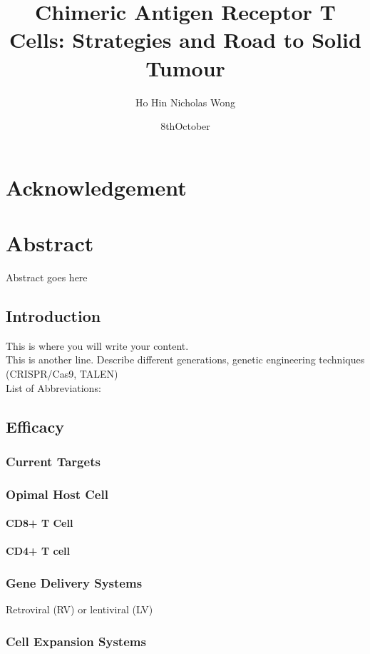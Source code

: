 \documentclass[12pt,oneside]{report}
\title{Chimeric Antigen Receptor T Cells: Strategies and Road to Solid Tumour}
\author{Ho Hin Nicholas Wong}
\date{8thOctober}
\begin{document}
 
\maketitle{} 

\chapter*{Acknowledgement}

\chapter*{Abstract}
Abstract goes here \citep{PERICA20181135}

\tableofcontents

\newpage
\section{Introduction} 
This is where you will write your content.\\
This is another line.\citep{CAR}
Describe different generations, genetic engineering techniques (CRISPR/Cas9, TALEN) \\
List of Abbreviations:

\newpage
\section{Efficacy}

\subsection{Current Targets}
\subsection{Opimal Host Cell}
\subsubsection{CD8+ T Cell}
\subsubsection{CD4+ T cell}
\subsection{Gene Delivery Systems}
Retroviral (RV) or lentiviral (LV) 
\subsection{Cell Expansion Systems}
\end{document}
